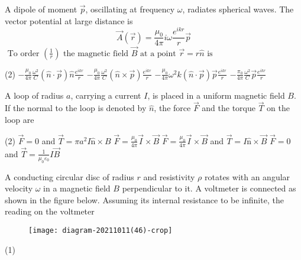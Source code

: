 \begin{enumerate}
\begin{minipage}{\textwidth}
	\item A dipole of moment $\vec{p}$, oscillating at frequency $\omega$, radiates spherical waves. The vector potential at large distance is\\
	$$\vec{A}(\vec{r})=\frac{\mu_{0}}{4 \pi} i \omega \frac{e^{i k r}}{r} \vec{p}$$	
	$\text { To order }\left(\frac{1}{r}\right) \text { the magnetic field } \vec{B} \text { at a point } \vec{r}=r \hat{n} \text { is }$
\end{minipage}
\begin{tasks}(2)
	\task[\textbf{A.}] $-\frac{\mu_{0}}{4 \pi} \frac{\omega^{2}}{C}(\hat{n} \cdot \vec{p}) \hat{n} \frac{e^{i k r}}{r}$
	\task[\textbf{B.}]$-\frac{\mu_{0}}{4 \pi} \frac{\omega^{2}}{C}(\hat{n} \times \vec{p}) \frac{e^{i k r}}{r}$
	\task[\textbf{C.}]$-\frac{\mu_{0}}{4 \pi} \omega^{2} k(\hat{n} \cdot \vec{p}) \vec{p} \frac{e^{i k r}}{r}$
	\task[\textbf{D.}]$-\frac{\pi_{0}}{4 \pi} \frac{\omega^{2}}{C} \vec{p} \frac{e^{i k r}}{r}$
\end{tasks}
\begin{minipage}{\textwidth}
	\item A loop of radius $a$, carrying a current $I$, is placed in a uniform magnetic field $B$. If the normal to the loop is denoted by $\hat{n}$, the force $\vec{F}$ and the torque $\vec{T}$ on the loop are
\end{minipage}
\begin{tasks}(2)
	\task[\textbf{A.}] $\vec{F}=0$ and $\vec{T}=\pi a^{2} I \hat{\mathrm{n}} \times B$
	\task[\textbf{B.}]$\vec{F}=\frac{\mu_{0}}{4 \pi} \vec{I} \times \vec{B}$
	\task[\textbf{C.}]$\vec{F}=\frac{\mu_{0}}{4 \pi} \vec{I} \times \vec{B}$ and $\vec{T}=I \hat{\mathrm{n}} \times \vec{B}$
	\task[\textbf{D.}]$\vec{F}=0$ and $\vec{T}=\frac{1}{\mu_{0} \varepsilon_{0}} I \vec{B}$
\end{tasks}
\begin{minipage}{\textwidth}
	\item A conducting circular disc of radius $r$ and resistivity $\rho$ rotates with an angular velocity $\omega$ in a magnetic field $B$ perpendicular to it. A voltmeter is connected as shown in the figure below. Assuming its internal resistance to be infinite, the reading on the voltmeter
	\begin{figure}[H]
		\centering
		\texttt{[image: diagram-20211011(46)-crop]}
	\end{figure}
\end{minipage}
\begin{tasks}(1)

\end{tasks}
\end{enumerate}
